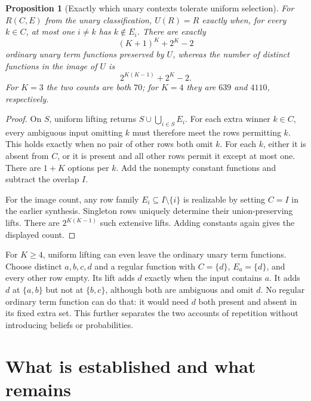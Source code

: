 \documentclass[11pt]{article}
\newtheorem{proposition}[theorem]{Proposition}
\begin{document}
\begin{proposition}[Exactly which unary contexts tolerate uniform selection]
For $R(C,E)$ from the unary classification, $U(R)=R$ exactly when, for
every $k\in C$, at most one $i\ne k$ has $k\notin E_i$. There are exactly
\[
 (K+1)^K+2^K-2
\]
ordinary unary term functions preserved by $U$, whereas the number of
distinct functions in the image of $U$ is
\[
 2^{K(K-1)}+2^K-2.
\]
For $K=3$ the two counts are both $70$; for $K=4$ they are $639$ and
$4110$, respectively.
\end{proposition}
\begin{proof}
On $S$, uniform lifting returns
$S\cup\bigcup_{i\in S}E_i$. For each extra winner $k\in C$, every
ambiguous input omitting $k$ must therefore meet the rows permitting
$k$. This holds exactly when no pair of other rows both omit $k$.
For each $k$, either it is absent from $C$, or it is present and all
other rows permit it except at most one. There are $1+K$ options per
$k$. Add the nonempty constant functions and subtract the overlap $I$.

For the image count, any row family $E_i\subseteq I\setminus\{i\}$ is
realizable by setting $C=I$ in the earlier synthesis. Singleton rows
uniquely determine their union-preserving lifts. There are
$2^{K(K-1)}$ such extensive lifts. Adding constants again gives the
displayed count.
\end{proof}

For $K\geq4$, uniform lifting can even leave the ordinary unary term
functions. Choose distinct $a,b,c,d$ and a regular function with
$C=\{d\}$, $E_a=\{d\}$, and every other row empty. Its lift adds $d$
exactly when the input contains $a$. It adds $d$ at $\{a,b\}$ but not
at $\{b,c\}$, although both are ambiguous and omit $d$. No regular
ordinary term function can do that: it would need $d$ both present and
absent in its fixed extra set. This further separates the two accounts
of repetition without introducing beliefs or probabilities.

\section{What is established and what remains}
\end{document}
